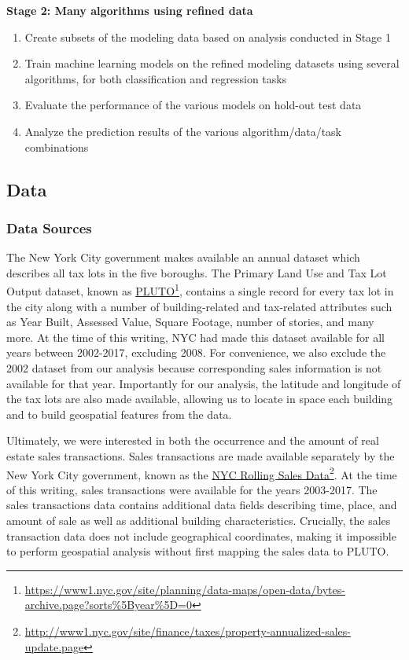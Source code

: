 \documentclass[12pt,]{article}
\providecommand{\tightlist}{%
  \setlength{\itemsep}{0pt}\setlength{\parskip}{0pt}}
\let\rmarkdownfootnote\footnote%
\def\footnote{\protect\rmarkdownfootnote}
\begin{document}
\noindent \textbf{Stage 2: Many algorithms using refined data}

\begin{enumerate}
\def\labelenumi{\arabic{enumi})}
\setcounter{enumi}{6}
\tightlist
\item
  Create subsets of the modeling data based on analysis conducted in
  Stage 1
\item
  Train machine learning models on the refined modeling datasets using
  several algorithms, for both classification and regression tasks
\item
  Evaluate the performance of the various models on hold-out test data
\item
  Analyze the prediction results of the various algorithm/data/task
  combinations
\end{enumerate}

\hypertarget{data}{%
\subsection{Data}\label{data}}

\hypertarget{data-sources}{%
\subsubsection{Data Sources}\label{data-sources}}

The New York City government makes available an annual dataset which
describes all tax lots in the five boroughs. The Primary Land Use and
Tax Lot Output dataset, known as
\href{https://www1.nyc.gov/site/planning/data-maps/open-data/bytes-archive.page?sorts\%5Byear\%5D=0}{PLUTO}\footnote{\url{https://www1.nyc.gov/site/planning/data-maps/open-data/bytes-archive.page?sorts\%5Byear\%5D=0}},
contains a single record for every tax lot in the city along with a
number of building-related and tax-related attributes such as Year
Built, Assessed Value, Square Footage, number of stories, and many more.
At the time of this writing, NYC had made this dataset available for all
years between 2002-2017, excluding 2008. For convenience, we also
exclude the 2002 dataset from our analysis because corresponding sales
information is not available for that year. Importantly for our
analysis, the latitude and longitude of the tax lots are also made
available, allowing us to locate in space each building and to build
geospatial features from the data.

Ultimately, we were interested in both the occurrence and the amount of
real estate sales transactions. Sales transactions are made available
separately by the New York City government, known as the
\href{http://www1.nyc.gov/site/finance/taxes/property-annualized-sales-update.page}{NYC
Rolling Sales Data}\footnote{\url{http://www1.nyc.gov/site/finance/taxes/property-annualized-sales-update.page}}.
At the time of this writing, sales transactions were available for the
years 2003-2017. The sales transactions data contains additional data
fields describing time, place, and amount of sale as well as additional
building characteristics. Crucially, the sales transaction data does not
include geographical coordinates, making it impossible to perform
geospatial analysis without first mapping the sales data to PLUTO.
\end{document}
